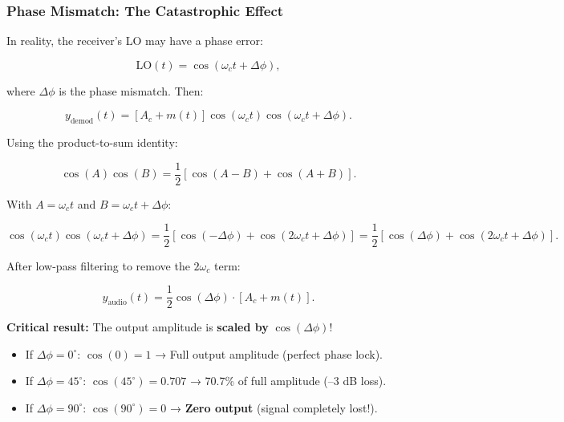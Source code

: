 \documentclass[11pt,letterpaper]{article}
\begin{document}
\subsubsection*{Phase Mismatch: The Catastrophic Effect}

In reality, the receiver's LO may have a phase error:

\begin{equation}
\text{LO}(t) = \cos(\omega_c t + \Delta \phi),
\end{equation}

\noindent
where $\Delta \phi$ is the phase mismatch. Then:

\begin{equation}
y_{\text{demod}}(t) = [A_c + m(t)] \cos(\omega_c t) \cos(\omega_c t + \Delta \phi).
\end{equation}

\noindent
Using the product-to-sum identity:

\begin{equation}
\cos(A) \cos(B) = \frac{1}{2}[\cos(A-B) + \cos(A+B)].
\end{equation}

\noindent
With $A = \omega_c t$ and $B = \omega_c t + \Delta \phi$:

\begin{equation}
\cos(\omega_c t) \cos(\omega_c t + \Delta \phi) = \frac{1}{2}[\cos(-\Delta \phi) + \cos(2\omega_c t + \Delta \phi)] = \frac{1}{2}[\cos(\Delta \phi) + \cos(2\omega_c t + \Delta \phi)].
\end{equation}

\noindent
After low-pass filtering to remove the $2\omega_c$ term:

\begin{equation}
y_{\text{audio}}(t) = \frac{1}{2} \cos(\Delta \phi) \cdot [A_c + m(t)].
\end{equation}

\noindent
\textbf{Critical result:} The output amplitude is \textbf{scaled by} $\cos(\Delta \phi)$!

\begin{itemize}
    \item If $\Delta \phi = 0^\circ$: $\cos(0) = 1$ → Full output amplitude (perfect phase lock).
    \item If $\Delta \phi = 45^\circ$: $\cos(45^\circ) = 0.707$ → 70.7\% of full amplitude (--3 dB loss).
    \item If $\Delta \phi = 90^\circ$: $\cos(90^\circ) = 0$ → \textbf{Zero output} (signal completely lost!).
\end{itemize}
\end{document}
